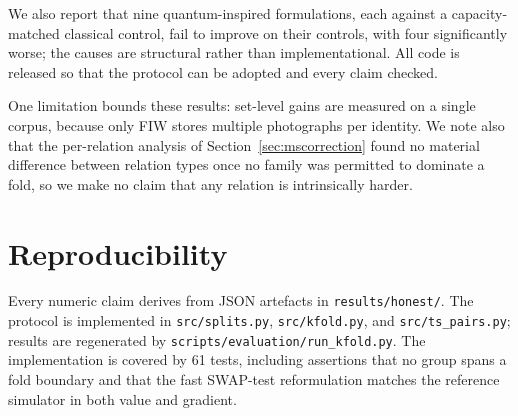 \documentclass[journal,12pt]{IEEEtran}
\begin{document}
We also report that nine quantum-inspired formulations, each against a
capacity-matched classical control, fail to improve on their controls, with
four significantly worse; the causes are structural rather than
implementational. All code is released so that the protocol can be adopted and
every claim checked.

One limitation bounds these results: set-level gains are measured on a single
corpus, because only FIW stores multiple photographs per identity. We note also
that the per-relation analysis of Section~\ref{sec:mscorrection} found no
material difference between relation types once no family was permitted to
dominate a fold, so we make no claim that any relation is intrinsically
harder.

\section*{Reproducibility}

Every numeric claim derives from JSON artefacts in \texttt{results/honest/}.
The protocol is implemented in \texttt{src/splits.py}, \texttt{src/kfold.py},
and \texttt{src/ts\_pairs.py}; results are regenerated by
\texttt{scripts/evaluation/run\_kfold.py}. The implementation is covered by 61
tests, including assertions that no group spans a fold boundary and that the
fast SWAP-test reformulation matches the reference simulator in both value and
gradient.
\end{document}

